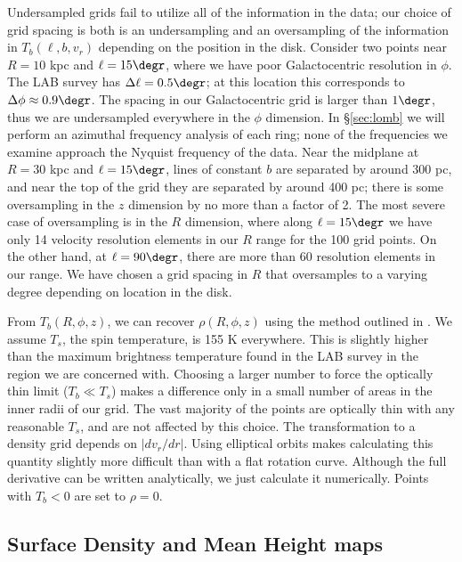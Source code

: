 \documentclass[apj]{emulateapj}
\begin{document}
 Undersampled grids fail to utilize all of the information in the data; our choice of grid spacing is both is an undersampling and an oversampling of the information in $T_b(\ell,b,v_r)$ depending on the position in the disk. Consider  two points near $R=10$ kpc and $\ell = 15\degr$, where we have poor Galactocentric resolution in $\phi$. The LAB survey has $\Delta \ell = 0.5\degr$; at this location this corresponds to $\Delta\phi\approx0.9\degr$. The spacing in our Galactocentric grid is larger than $1\degr$, thus we are undersampled everywhere in the $\phi$ dimension. In \S \ref{sec:lomb} we will perform an azimuthal frequency analysis of each ring; none of the frequencies we examine approach the Nyquist frequency of the data.  Near the midplane at $R=30$ kpc and $\ell =15\degr$, lines of constant $b$  are separated by around 300 pc, and near the top of the grid they are separated by around 400 pc; there is some oversampling in the $z$ dimension by no more than a factor of 2. The most severe case of oversampling is in the $R$ dimension, where along $\ell = 15\degr$ we have only 14 velocity resolution elements in our $R$ range for the 100 grid points. On the other hand, at $\ell=90\degr$, there are more than 60 resolution elements in our range.  We have chosen a grid spacing in $R$ that oversamples to a varying degree depending on location in the disk. 


From $T_b(R,\phi,z)$, we can recover $\rho(R,\phi,z)$ using the method outlined in \citet{K1968}. We assume $T_s$, the spin temperature, is 155 K everywhere. This is slightly higher than the maximum brightness temperature found in the LAB survey in the region we are concerned with. Choosing a larger number to force the optically thin limit ($T_b\ll T_s$) makes a difference only in a small number of areas in the inner radii of our grid. The vast majority of the points are optically thin with any reasonable $T_s$, and are not affected by this choice. 
The transformation to a density grid depends on $|dv_r/dr|$. Using elliptical orbits makes calculating this quantity slightly more difficult than with a flat rotation curve. Although the full derivative can be written analytically, we just calculate it numerically.
Points with $T_b<0$ are set to $\rho =0$.



\subsection{Surface Density and Mean Height maps}
\end{document}
